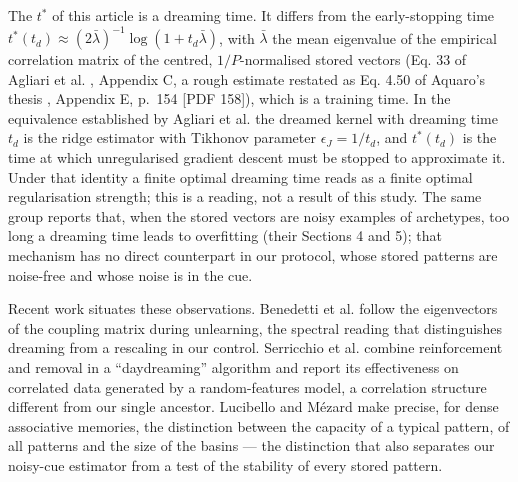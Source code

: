 The \(t^*\) of this article is a dreaming time. It differs from the
early-stopping time
\(t^*(t_d) \approx (2\bar\lambda)^{-1}\log(1 + t_d\bar\lambda)\), with
\(\bar\lambda\) the mean eigenvalue of the empirical correlation matrix
of the centred, \(1/P\)-normalised stored vectors (Eq. 33 of Agliari et
al. \supercite{agliari2024regularization}, Appendix C, a rough estimate
restated as Eq. 4.50 of Aquaro's thesis \supercite{aquaro2025thesis},
Appendix E, p.~154 {[}PDF 158{]}), which is a training time. In the
equivalence established by Agliari et al.
\supercite{agliari2024regularization} the dreamed kernel with dreaming
time \(t_d\) is the ridge estimator with Tikhonov parameter
\(\epsilon_J = 1/t_d\), and \(t^*(t_d)\) is the time at which
unregularised gradient descent must be stopped to approximate it. Under
that identity a finite optimal dreaming time reads as a finite optimal
regularisation strength; this is a reading, not a result of this study.
The same group reports that, when the stored vectors are noisy examples
of archetypes, too long a dreaming time leads to overfitting (their
Sections 4 and 5); that mechanism has no direct counterpart in our
protocol, whose stored patterns are noise-free and whose noise is in the
cue.

Recent work situates these observations. Benedetti et al.
\supercite{benedetti2024eigenvector} follow the eigenvectors of the
coupling matrix during unlearning, the spectral reading that
distinguishes dreaming from a rescaling in our control. Serricchio et
al. \supercite{serricchio2025daydreaming} combine reinforcement and
removal in a ``daydreaming'' algorithm and report its effectiveness on
correlated data generated by a random-features model, a correlation
structure different from our single ancestor. Lucibello and Mézard
\supercite{lucibello2024exponential} make precise, for dense associative
memories, the distinction between the capacity of a typical pattern, of
all patterns and the size of the basins --- the distinction that also
separates our noisy-cue estimator from a test of the stability of every
stored pattern.

